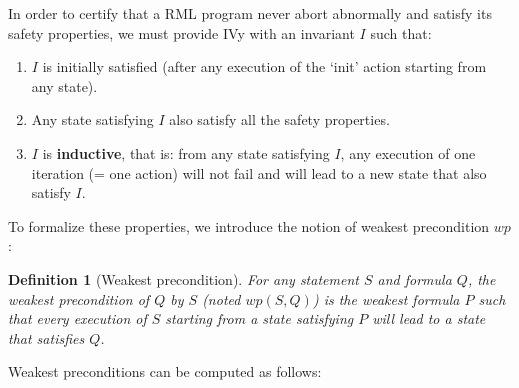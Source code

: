 \documentclass[11pt,a4paper,oldfontcommands,openany]{memoir}
\newtheorem*{definition}{Definition}
\begin{document}
    In order to certify that a RML program never abort abnormally and satisfy its safety properties, we must provide IVy with an invariant \(I\) such that:
    \begin{enumerate}
        \item \(I\) is initially satisfied (after any execution of the `init' action starting from any state).
        \item Any state satisfying \(I\) also satisfy all the safety properties.
        \item \(I\) is \textbf{inductive}, that is: from any state satisfying \(I\), any execution of one iteration (= one action) will not fail and
        will lead to a new state that also satisfy \(I\). 
    \end{enumerate}

    To formalize these properties, we introduce the notion of weakest precondition \(wp\):
    \begin{definition}[Weakest precondition]
        For any statement \(S\) and formula \(Q\), the weakest precondition of \(Q\) by \(S\) (noted \(wp(S,Q)\)) is the weakest formula \(P\) such that
        every execution of \(S\) starting from a state satisfying \(P\) will lead to a state that satisfies \(Q\).
    \end{definition}

    Weakest preconditions can be computed as follows:\\
\end{document}
